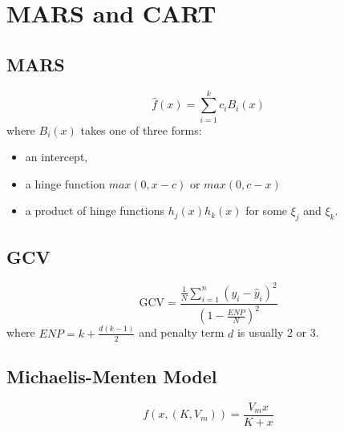 \documentclass[a4paper,9pt,fleqn]{extarticle}
\begin{document}
\section{MARS and CART}
\begin{minipage}[t]{0.45\textwidth}
\subsection*{MARS}
\[
    \hat{f}(x) = \sum_{i=1}^{k}c_iB_i(x)
\]
where \(B_i(x)\) takes one of three forms:
\begin{itemize}
    \item an intercept,
    \item a hinge function \(max(0, x - c) \text{ or } max(0,  c -x)\)
    \item a product of hinge functions \(h_j(x)h_k(x)\) for some \(\xi_j\) and \(\xi_k\).
\end{itemize}
\end{minipage}
\hspace{0.05\textwidth}
\begin{minipage}[t]{0.45\textwidth}
\subsection*{GCV}
\[
    \text{GCV} = \frac{\frac{1}{N}\sum_{i=1}^{n}(y_i - \hat{y}_i)^2}{\left(1 - \frac{ENP}{N}\right)^2}
\]
where \(ENP = k + \frac{d(k - 1)}{2}\) and penalty term \(d\) is usually 2 or 3.
\vspace{1.2em}
\subsection*{Michaelis-Menten Model}
\[
    f(x, (K, V_m)) = \frac{V_mx}{K + x}
\]
\end{minipage}
\end{document}
